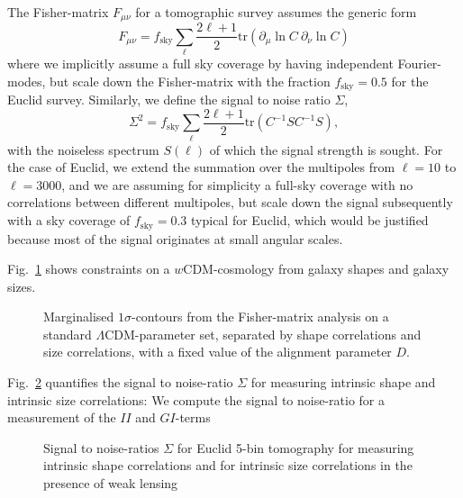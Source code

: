 \documentclass[a4paper,fleqn,usenatbib]{mnras}
\begin{document}
The Fisher-matrix $F_{\mu\nu}$ for a tomographic survey assumes the generic form
\begin{equation}
F_{\mu\nu} = f_\mathrm{sky}\sum_\ell\frac{2\ell+1}{2}\mathrm{tr}\left(\partial_\mu\ln C\:\partial_\nu\ln C\right)
\end{equation}
where we implicitly assume a full sky coverage by having independent Fourier-modes, but scale down the Fisher-matrix with the fraction $f_\mathrm{sky} = 0.5$ for the Euclid survey. Similarly, we define the signal to noise ratio $\Sigma$,
\begin{equation}
\Sigma^2 = f_\mathrm{sky}\sum_\ell\frac{2\ell+1}{2}\mathrm{tr}\left(C^{-1}SC^{-1}S\right),
\end{equation}
with the noiseless spectrum $S(\ell)$ of which the signal strength is sought. For the case of Euclid, we extend the summation over the multipoles from $\ell=10$ to $\ell=3000$, and we are assuming for simplicity a full-sky coverage with no correlations between different multipoles, but scale down the signal subsequently with a sky coverage of $f_\mathrm{sky}=0.3$ typical for Euclid, which would be justified because most of the signal originates at small angular scales.

Fig.~\ref{fig:fisher} shows constraints on a $w$CDM-cosmology from galaxy shapes and galaxy sizes.

\begin{figure}
\centering
\caption{Marginalised $1\sigma$-contours from the Fisher-matrix analysis on a standard $\Lambda$CDM-parameter set, separated by shape correlations and size correlations, with a fixed value of the alignment parameter $D$.}
\label{fig:fisher}
\end{figure}

Fig.~\ref{fig:s2n} quantifies the signal to noise-ratio $\Sigma$ for measuring intrinsic shape and intrinsic size correlations: We compute the signal to noise-ratio for a measurement of the $II$ and $GI$-terms 

\begin{figure}
\centering
\caption{Signal to noise-ratios $\Sigma$ for Euclid 5-bin tomography for measuring intrinsic shape correlations and for intrinsic size correlations in the presence of weak lensing}
\label{fig:s2n}
\end{figure}


\end{document}
